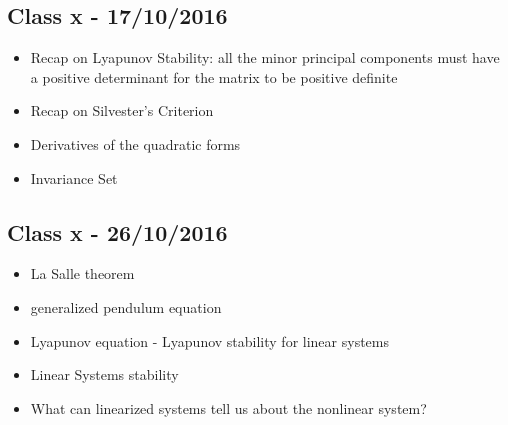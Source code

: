 \subsection*{Class x -  17/10/2016}


\begin{itemize}
\item Recap on Lyapunov Stability: all the minor principal components must have a positive determinant for the matrix to be positive definite
\item Recap on Silvester's Criterion
\item Derivatives of the quadratic forms
\item Invariance Set
\end{itemize}
\subsection*{Class x -  26/10/2016}
\begin{itemize}
\item La Salle theorem
\item generalized pendulum equation
\item Lyapunov equation - Lyapunov stability for linear systems
\item Linear Systems stability
\item What can linearized systems tell us about the nonlinear system?
\end{itemize}
